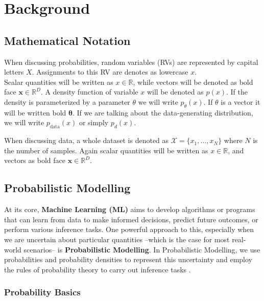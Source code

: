 \usetikzlibrary{calc}

\renewcommand{\vec}[1]{\textbf{#1}}
\newcommand{\norm}[1]{\left\lVert#1\right\rVert}


\chapter{Background}
\label{cha:background}

\section{Mathematical Notation}

When discussing probabilities, random variables (RVs) are represented by capital letters $X$. Assignments to this RV are denotes as lowercase $x$. \\ 
Scalar quantities will be written as $x \in \mathbb{R}$, while vectors will be denoted as bold face $\vec x \in \mathbb{R}^D$.
A density function of variable $x$ will be denoted as $p(x)$. If the density is parameterized by a parameter $\theta$ we will write 
$p_\theta(x)$. If $\theta$ is a vector it will be written bold $\boldsymbol{\theta}$.
If we are talking about the data-generating distribution, we will write $p_{\text{data}}(x)$ or simply $p_d(x)$.

When discussing data, a whole dataset is denoted as $\mathcal{X} = \{x_1, ... , x_N\}$ where $N$ is the number of samples. 
Again scalar quantities will be written as $x \in \mathbb{R}$, and vectors as bold face $\vec x \in \mathbb{R}^D$.

\section{Probabilistic Modelling}
\label{sec:pm}

At its core, \textbf{Machine Learning (ML)} aims to develop algorithms or programs that can learn from data to make informed decisions, predict future outcomes, or perform various inference tasks. 
One powerful approach to this, especially when we are uncertain about particular quantities
--which is the case for most real-world scenarios-- is \textbf{Probabilistic Modelling}.
In Probabilistic Modelling, we use probabilities and probability densities to represent this uncertainty and employ the rules of probability theory to carry out inference tasks \cite{pc_intro}.

\subsection{Probability Basics}
\label{sec:prob_basics}

